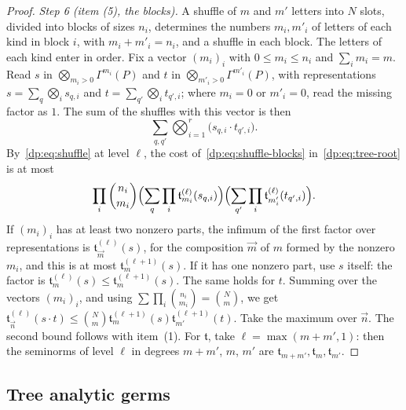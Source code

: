 \documentclass[11pt]{amsart}
\theoremstyle{definition}
\theoremstyle{remark}
\numberwithin{equation}{section}
\theoremstyle{plain}
\theoremstyle{definition}
\theoremstyle{plain}
\begin{document}
\begin{proof}
\emph{Step 6 (item (5), the blocks).} A shuffle of $m$ and $m'$ letters into $N$ slots, divided into blocks of sizes $n_i$, determines the numbers $m_i,m'_i$ of letters of each kind in block $i$, with $m_i+m'_i=n_i$, and a shuffle in each block. The letters of each kind enter in order. Fix a vector $(m_i)_i$ with $0\le m_i\le n_i$ and $\sum_im_i=m$. Read $s$ in $\bigotimes_{m_i>0}\Gamma^{m_i}(P)$ and $t$ in $\bigotimes_{m'_i>0}\Gamma^{m'_i}(P)$, with representations $s=\sum_q\bigotimes_is_{q,i}$ and $t=\sum_{q'}\bigotimes_it_{q',i}$; where $m_i=0$ or $m'_i=0$, read the missing factor as $1$. The sum of the shuffles with this vector is then
\begin{equation}\label{dp:eq:shuffle-blocks}
 \sum_{q,q'}\bigotimes_{i=1}^r\bigl(s_{q,i}\cdot t_{q',i}\bigr).
\end{equation}
By~\eqref{dp:eq:shuffle} at level $\ell$, the cost of~\eqref{dp:eq:shuffle-blocks} in~\eqref{dp:eq:tree-root} is at most
\[
 \prod_i\binom{n_i}{m_i}\Bigl(\sum_q\prod_i\mathfrak t^{(\ell)}_{m_i}(s_{q,i})\Bigr)\Bigl(\sum_{q'}\prod_i\mathfrak t^{(\ell)}_{m'_i}(t_{q',i})\Bigr).
\]
If $(m_i)_i$ has at least two nonzero parts, the infimum of the first factor over representations is $\mathfrak t^{(\ell)}_{\vec m}(s)$, for the composition $\vec m$ of $m$ formed by the nonzero $m_i$, and this is at most $\mathfrak t^{(\ell+1)}_m(s)$. If it has one nonzero part, use $s$ itself: the factor is $\mathfrak t^{(\ell)}_m(s)\le\mathfrak t^{(\ell+1)}_m(s)$. The same holds for $t$. Summing over the vectors $(m_i)_i$, and using $\sum\prod_i\binom{n_i}{m_i}=\binom Nm$, we get $\mathfrak t^{(\ell)}_{\vec n}(s\cdot t)\le\binom Nm\mathfrak t^{(\ell+1)}_m(s)\mathfrak t^{(\ell+1)}_{m'}(t)$. Take the maximum over $\vec n$. The second bound follows with item~(1). For $\mathfrak t$, take $\ell=\max(m+m',1)$: then the seminorms of level $\ell$ in degrees $m+m'$, $m$, $m'$ are $\mathfrak t_{m+m'},\mathfrak t_m,\mathfrak t_{m'}$.
\end{proof}

\subsection{Tree analytic germs}\label{dp:ssec:ta}
\end{document}
